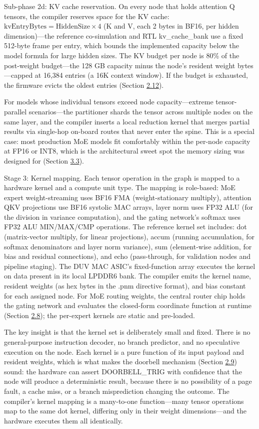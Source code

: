 \documentclass[12pt,onecolumn]{article}
\begin{document}
Sub-phase 2d: KV cache reservation. On every node that holds attention Q tensors, the compiler reserves space for the KV cache: $\mathrm{kvEntryBytes} = \mathrm{HiddenSize} \times 4$ (K and V, each 2 bytes in BF16, per hidden dimension)---the reference co-simulation and RTL kv\_cache\_bank use a fixed 512-byte frame per entry, which bounds the implemented capacity below the model formula for large hidden sizes. The KV budget per node is 80\% of the post-weight budget---the 128 GB capacity minus the node's resident weight bytes---capped at 16,384 entries (a 16K context window). If the budget is exhausted, the firmware evicts the oldest entries (Section \hyperref[sec:2.12]{2.12}).

For models whose individual tensors exceed node capacity---extreme tensor-parallel scenarios---the partitioner shards the tensor across multiple nodes on the same layer, and the compiler inserts a local reduction kernel that merges partial results via single-hop on-board routes that never enter the spine. This is a special case: most production MoE models fit comfortably within the per-node capacity at FP16 or INT8, which is the architectural sweet spot the memory sizing was designed for (Section \hyperref[sec:3.3]{3.3}).

Stage 3: Kernel mapping. Each tensor operation in the graph is mapped to a hardware kernel and a compute unit type. The mapping is role-based: MoE expert weight-streaming uses BF16 FMA (weight-stationary multiply), attention QKV projections use BF16 systolic MAC arrays, layer norm uses FP32 ALU (for the division in variance computation), and the gating network's softmax uses FP32 ALU MIN/MAX/CMP operations. The reference kernel set includes: dot (matrix-vector multiply, for linear projections), accum (running accumulation, for softmax denominators and layer norm variance), sum (element-wise addition, for bias and residual connections), and echo (pass-through, for validation nodes and pipeline staging). The DUV MAC ASIC's fixed-function array executes the kernel on data present in its local LPDDR6 bank. The compiler emits the kernel name, resident weights (as hex bytes in the .pnm directive format), and bias constant for each assigned node. For MoE routing weights, the central router chip holds the gating network and evaluates the closed-form coordinate function at runtime (Section \hyperref[sec:2.8]{2.8}); the per-expert kernels are static and pre-loaded.

The key insight is that the kernel set is deliberately small and fixed. There is no general-purpose instruction decoder, no branch predictor, and no speculative execution on the node. Each kernel is a pure function of its input payload and resident weights, which is what makes the doorbell mechanism (Section \hyperref[sec:2.9]{2.9}) sound: the hardware can assert DOORBELL\_TRIG with confidence that the node will produce a deterministic result, because there is no possibility of a page fault, a cache miss, or a branch misprediction changing the outcome. The compiler's kernel mapping is a many-to-one function---many tensor operations map to the same dot kernel, differing only in their weight dimensions---and the hardware executes them all identically.
\end{document}
